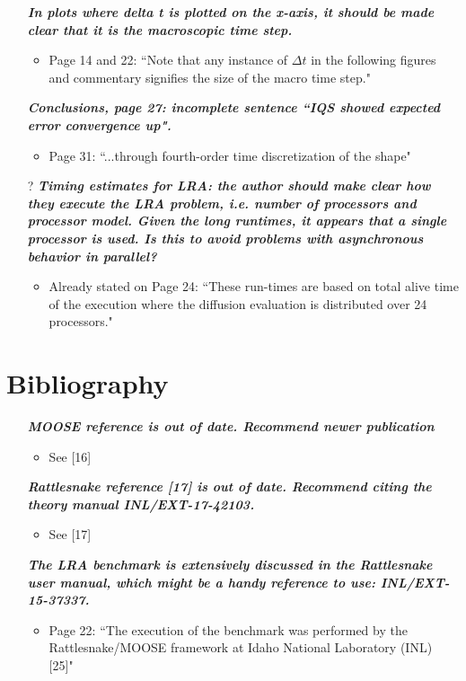 \documentclass{elsarticle}
\newcommand{\nofix}{?}
\newcommand{\done}{\checkmark}
\newcommand{\easy}[1]{\textbf{\textit{#1}}}
\begin{document}
\begin{itemize}
\item[\done] \easy{ In plots where delta t is plotted on the x-axis, it should be made clear that it is the macroscopic time step. }
\begin{itemize}
\item Page 14 and 22: ``Note that any instance of $\Delta t$ in the following figures and commentary signifies the size of the macro time step."
\end{itemize}

\item[\done] \easy{ Conclusions, page 27: incomplete sentence ``IQS showed expected error convergence up". }
\begin{itemize}
\item Page 31: ``...through fourth-order time discretization of the shape"
\end{itemize}

\item[\nofix] \easy{ Timing estimates for LRA: the author should make clear how they execute the LRA problem, i.e. number of processors and processor model. Given the long runtimes, it appears that a single processor is used. Is this to avoid problems with asynchronous behavior in parallel? }
\begin{itemize}
\item Already stated on Page 24: ``These run-times are based on total alive time of the execution where the diffusion evaluation is distributed over 24 processors."
\end{itemize}

\end{itemize}

\section*{Bibliography}

\begin{itemize}

\item[\done] \easy{ MOOSE reference is out of date. Recommend newer publication }
\begin{itemize}
\item See [16]
\end{itemize}

\item[\done] \easy{ Rattlesnake reference [17] is out of date. Recommend citing the theory manual INL/EXT-17-42103. }
\begin{itemize}
\item See [17]
\end{itemize}

\item[\done] \easy{ The LRA benchmark is extensively discussed in the Rattlesnake user manual, which might be a handy reference to use: INL/EXT-15-37337. }
\begin{itemize}
\item Page 22: ``The execution of the benchmark was performed by the Rattlesnake/MOOSE framework at Idaho National Laboratory (INL) [25]"
\end{itemize}

\end{itemize}
\end{document}
